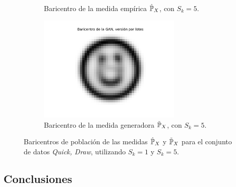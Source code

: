\begin{figure}[htbp]
\begin{subfigure}[b]{0.45\textwidth}
        \caption{Baricentro de la medida empírica $\hat\Prob_X$, con $S_k=5$.}
        \label{fig:batch-bar-DS}
    \end{subfigure}
    \hfill
    \begin{subfigure}[b]{0.45\textwidth}
        \centering
        \includegraphics[width=0.75\textwidth]{img/barycenters/batch-bar-GAN.pdf}
        \caption{Baricentro de la medida generadora $\tilde\Prob_X$, con $S_k=5$.}
        \label{fig:batch-bar-GAN}
    \end{subfigure}
    \caption{Baricentros de población de las medidas $\hat\Prob_X$ y $\tilde\Prob_X$ para el conjunto de datos \textit{Quick, Draw}, utilizando $S_k=1$ y $S_k=5$.}
    \label{fig:barycenters}
\end{figure}
















\subsection{Conclusiones}\label{ssec:sgdw-conclusiones}  %



